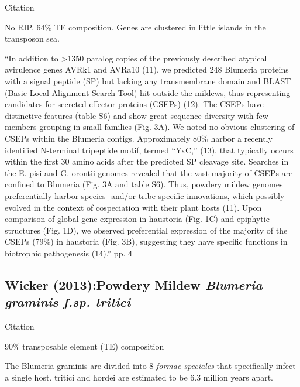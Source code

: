   Citation \cite{spanu_genome_2010}

  No RIP, 64\% TE composition. Genes are clustered in little islands in the transposon sea.


  ``In addition to >1350 paralog copies of the previously described atypical
  avirulence genes AVRk1 and AVRa10 (11), we predicted 248 Blumeria proteins with
  a signal peptide (SP) but lacking any transmembrane domain and BLAST (Basic
  Local Alignment Search Tool) hit outside the mildews, thus representing
  candidates for secreted effector proteins (CSEPs) (12). The CSEPs have
  distinctive features (table S6) and show great sequence diversity with few
  members grouping in small families (Fig. 3A). We noted no obvious clustering of
  CSEPs within the Blumeria contigs. Approximately 80\% harbor a recently
  identified N-terminal tripeptide motif, termed “YxC,” (13), that typically
  occurs within the first 30 amino acids after the predicted SP cleavage site.
  Searches in the E. pisi and G. orontii genomes revealed that the vast majority
  of CSEPs are confined to Blumeria (Fig. 3A and table S6).  Thus, powdery mildew
  genomes preferentially harbor species- and/or tribe-specific innovations, which
  possibly evolved in the context of cospeciation with their plant hosts (11).
  Upon comparison of global gene expression in haustoria (Fig. 1C) and epiphytic
  structures (Fig. 1D), we observed preferential expression of the majority of
  the CSEPs (79\%) in haustoria (Fig. 3B), suggesting they have specific
  functions in biotrophic pathogenesis (14).'' pp. 4


\subsection{Wicker (2013):Powdery Mildew \textit{ Blumeria graminis f.sp. tritici}}

  Citation \cite{wicker_wheat_2013}

  90\% transposable element (TE) composition

  The Blumeria graminis are divided into 8 \textit{formae speciales} that
  specifically infect a single host. tritici and hordei are estimated to be
  6.3 million years apart. 


